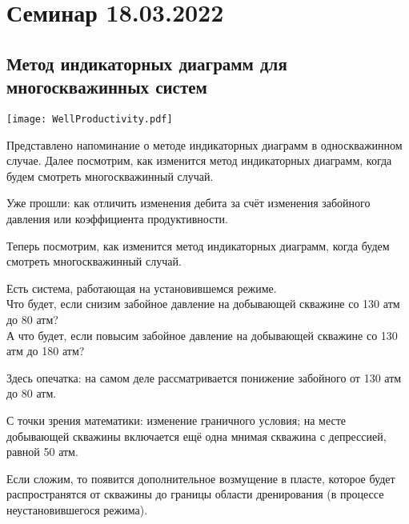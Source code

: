 \documentclass[main.tex]{subfiles}
\begin{document}
\section{Семинар 18.03.2022}

\subsection{Метод индикаторных диаграмм для многоскважинных систем}

\texttt{[image: WellProductivity.pdf]}

Представлено напоминание о методе индикаторных диаграмм в односкважинном случае. Далее посмотрим, как изменится метод индикаторных диаграмм, когда будем смотреть многоскважинный случай.

Уже прошли: как отличить изменения дебита за счёт изменения забойного давления или коэффициента продуктивности.

Теперь посмотрим, как изменится метод индикаторных диаграмм, когда будем смотреть многоскважинный случай.


Есть система, работающая на установившемся режиме.\\

Что будет, если снизим забойное давление на добывающей скважине со 130 атм до 80 атм?\\

А что будет, если повысим забойное давление на добывающей скважине со 130 атм до 180 атм?\\


Здесь опечатка: на самом деле рассматривается понижение забойного от 130 атм до 80 атм.

С точки зрения математики: изменение граничного условия; на месте добывающей скважины включается ещё одна мнимая скважина с депрессией, равной 50 атм.

Если сложим, то появится дополнительное возмущение в пласте, которое будет распространятся от скважины до границы области дренирования (в процессе неустановившегося режима).
\end{document}

